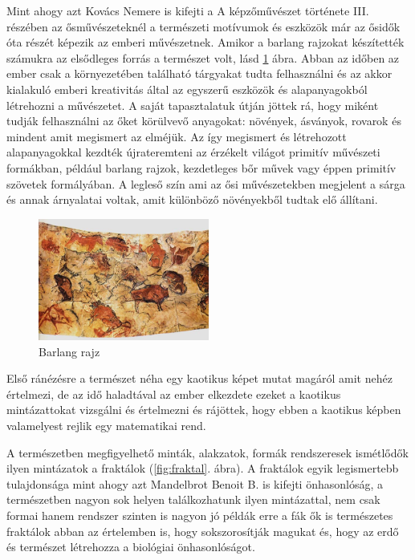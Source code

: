 \documentclass[fontsize=12pt, appendixprefix=true]{scrreprt}
\begin{document}
Mint ahogy azt Kovács Nemere is kifejti a A képzőművészet története III. részében az ősművészeteknél \cite{nemerekepzHomHuveszet} a természeti motívumok és eszközök már az ősidők óta részét képezik az emberi művészetnek. Amikor a barlang rajzokat készítették számukra az elsődleges forrás a természet volt, lásd \ref{fig:osi} ábra.
Abban az időben az ember csak a környezetében található tárgyakat tudta felhasználni és az akkor kialakuló emberi kreativitás által az egyszerű eszközök és alapanyagokból létrehozni a művészetet. A saját tapasztalatuk útján jöttek rá, hogy miként tudják felhasználni az őket körülvevő anyagokat: növények, ásványok, rovarok és mindent amit megismert az elméjük. Az így megismert és létrehozott alapanyagokkal kezdték újrateremteni az érzékelt világot primitív művészeti formákban, például barlang rajzok, kezdetleges bőr művek vagy éppen primitív szövetek formályában. A legleső szín ami az ősi művészetekben megjelent a sárga és annak árnyalatai voltak, amit különböző növényekből tudtak elő állítani.

\begin{figure}[h!]
	\centering
	\includegraphics[width=0.5\textwidth]{img/osi.jpg}
	\caption{Barlang rajz}
	\label{fig:osi}
\end{figure}

Első ránézésre a természet néha egy kaotikus képet mutat magáról amit nehéz értelmezi, de az idő haladtával az ember elkezdete ezeket a kaotikus mintázattokat vizsgálni és értelmezni és rájöttek, hogy ebben a kaotikus képben valamelyest rejlik egy matematikai rend.

A természetben megfigyelhető minták, alakzatok, formák rendszeresek ismétlődők ilyen mintázatok a fraktálok (\ref{fig:fraktal}. ábra). A fraktálok egyik legismertebb tulajdonsága mint ahogy azt Mandelbrot Benoit B. is kifejti \cite{mandelbrot1982fractal} önhasonlóság, a természetben nagyon sok helyen találkozhatunk ilyen mintázattal, nem csak formai hanem rendszer szinten is nagyon jó példák erre a fák ők is természetes fraktálok abban az értelemben is, hogy sokszorosítják magukat és, hogy az erdő és természet létrehozza a biológiai önhasonlóságot. 
\end{document}
